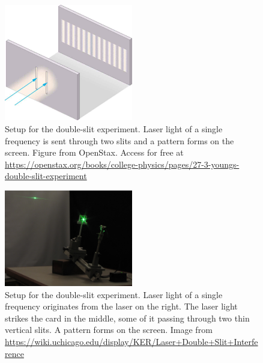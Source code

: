 \begin{figure}
	\centering
	\includegraphics[width=0.5\textwidth]{laser-interference-remote/double-slit-setup.jpeg}
	\caption{Setup for the double-slit experiment. Laser light of a single frequency is sent through
		two slits and a pattern forms on the screen. Figure from OpenStax. Access for free at \url{https://openstax.org/books/college-physics/pages/27-3-youngs-double-slit-experiment}}\label{lir:fig:setup}
\end{figure}

\begin{figure}
	\centering
	\includegraphics[width=0.5\textwidth]{laser-interference-remote/laser_double_slit_intererfence.JPG}
	\caption{Setup for the double-slit experiment. Laser light of a single frequency originates from the laser on the right. The laser light strikes the card in the middle, some of it passing through two thin vertical slits. A pattern forms on the screen. Image from \url{https://wiki.uchicago.edu/display/KER/Laser+Double+Slit+Interference} }\label{lir:fig:setup-photo}
\end{figure}


